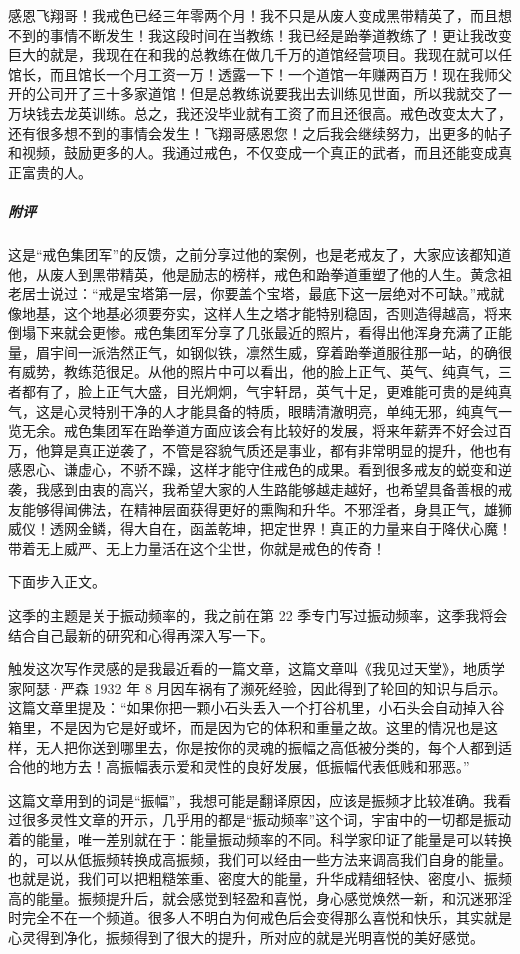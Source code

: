 \begin{case}
    感恩飞翔哥！我戒色已经三年零两个月！我不只是从废人变成黑带精英了，而且想不到的事情不断发生！我这段时间在当教练！我已经是跆拳道教练了！更让我改变巨大的就是，我现在在和我的总教练在做几千万的道馆经营项目。我现在就可以任馆长，而且馆长一个月工资一万！透露一下！一个道馆一年赚两百万！现在我师父开的公司开了三十多家道馆！但是总教练说要我出去训练见世面，所以我就交了一万块钱去龙英训练。总之，我还没毕业就有工资了而且还很高。戒色改变太大了，还有很多想不到的事情会发生！飞翔哥感恩您！之后我会继续努力，出更多的帖子和视频，鼓励更多的人。我通过戒色，不仅变成一个真正的武者，而且还能变成真正富贵的人。
    \subparagraph{附评} 这是“戒色集团军”的反馈，之前分享过他的案例，也是老戒友了，大家应该都知道他，从废人到黑带精英，他是励志的榜样，戒色和跆拳道重塑了他的人生。黄念祖老居士说过：“戒是宝塔第一层，你要盖个宝塔，最底下这一层绝对不可缺。”戒就像地基，这个地基必须要夯实，这样人生之塔才能特别稳固，否则造得越高，将来倒塌下来就会更惨。戒色集团军分享了几张最近的照片，看得出他浑身充满了正能量，眉宇间一派浩然正气，如钢似铁，凛然生威，穿着跆拳道服往那一站，的确很有威势，教练范很足。从他的照片中可以看出，他的脸上正气、英气、纯真气，三者都有了，脸上正气大盛，目光炯炯，气宇轩昂，英气十足，更难能可贵的是纯真气，这是心灵特别干净的人才能具备的特质，眼睛清澈明亮，单纯无邪，纯真气一览无余。戒色集团军在跆拳道方面应该会有比较好的发展，将来年薪弄不好会过百万，他算是真正逆袭了，不管是容貌气质还是事业，都有非常明显的提升，他也有感恩心、谦虚心，不骄不躁，这样才能守住戒色的成果。看到很多戒友的蜕变和逆袭，我感到由衷的高兴，我希望大家的人生路能够越走越好，也希望具备善根的戒友能够得闻佛法，在精神层面获得更好的熏陶和升华。不邪淫者，身具正气，雄狮威仪！透网金鳞，得大自在，函盖乾坤，把定世界！真正的力量来自于降伏心魔！带着无上威严、无上力量活在这个尘世，你就是戒色的传奇！
\end{case}

下面步入正文。

这季的主题是关于振动频率的，我之前在第 22 季专门写过振动频率，这季我将会结合自己最新的研究和心得再深入写一下。

触发这次写作灵感的是我最近看的一篇文章，这篇文章叫《我见过天堂》，地质学家阿瑟·严森 1932 年 8 月因车祸有了濒死经验，因此得到了轮回的知识与启示。这篇文章里提及：“如果你把一颗小石头丢入一个打谷机里，小石头会自动掉入谷箱里，不是因为它是好或坏，而是因为它的体积和重量之故。这里的情况也是这样，无人把你送到哪里去，你是按你的灵魂的振幅之高低被分类的，每个人都到适合他的地方去！高振幅表示爱和灵性的良好发展，低振幅代表低贱和邪恶。”

这篇文章用到的词是“振幅”，我想可能是翻译原因，应该是振频才比较准确。我看过很多灵性文章的开示，几乎用的都是“振动频率”这个词，宇宙中的一切都是振动着的能量，唯一差别就在于：能量振动频率的不同。科学家印证了能量是可以转换的，可以从低振频转换成高振频，我们可以经由一些方法来调高我们自身的能量。也就是说，我们可以把粗糙笨重、密度大的能量，升华成精细轻快、密度小、振频高的能量。振频提升后，就会感觉到轻盈和喜悦，身心感觉焕然一新，和沉迷邪淫时完全不在一个频道。很多人不明白为何戒色后会变得那么喜悦和快乐，其实就是心灵得到净化，振频得到了很大的提升，所对应的就是光明喜悦的美好感觉。

